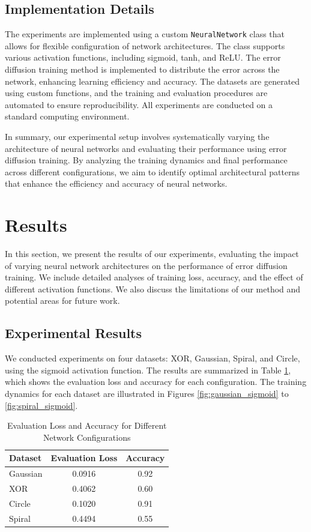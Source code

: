 \documentclass{article} %
\begin{document}
\subsection{Implementation Details}
The experiments are implemented using a custom \texttt{NeuralNetwork} class that allows for flexible configuration of network architectures. The class supports various activation functions, including sigmoid, tanh, and ReLU. The error diffusion training method is implemented to distribute the error across the network, enhancing learning efficiency and accuracy. The datasets are generated using custom functions, and the training and evaluation procedures are automated to ensure reproducibility. All experiments are conducted on a standard computing environment.

In summary, our experimental setup involves systematically varying the architecture of neural networks and evaluating their performance using error diffusion training. By analyzing the training dynamics and final performance across different configurations, we aim to identify optimal architectural patterns that enhance the efficiency and accuracy of neural networks.

\section{Results}
\label{sec:results}

In this section, we present the results of our experiments, evaluating the impact of varying neural network architectures on the performance of error diffusion training. We include detailed analyses of training loss, accuracy, and the effect of different activation functions. We also discuss the limitations of our method and potential areas for future work.

\subsection{Experimental Results}
We conducted experiments on four datasets: XOR, Gaussian, Spiral, and Circle, using the sigmoid activation function. The results are summarized in Table \ref{tab:results}, which shows the evaluation loss and accuracy for each configuration. The training dynamics for each dataset are illustrated in Figures \ref{fig:gaussian_sigmoid} to \ref{fig:spiral_sigmoid}.

\begin{table}[h]
    \centering
    \caption{Evaluation Loss and Accuracy for Different Network Configurations}
    \label{tab:results}
    \begin{tabular}{lcc}
        \toprule
        \textbf{Dataset} & \textbf{Evaluation Loss} & \textbf{Accuracy} \\
        \midrule
        Gaussian & 0.0916 & 0.92 \\
        XOR & 0.4062 & 0.60 \\
        Circle & 0.1020 & 0.91 \\
        Spiral & 0.4494 & 0.55 \\
        \bottomrule
    \end{tabular}
\end{table}
\end{document}
